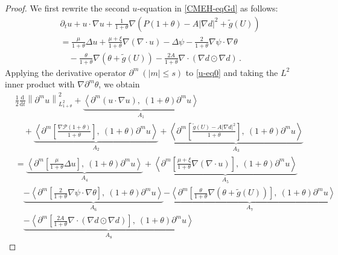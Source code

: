 \documentclass[reqno,11pt]{amsart}
\numberwithin{equation}{section}
\def\p{\partial}
\def\d{\mathrm{d}}
\begin{document}
\begin{proof}

We first rewrite the second $u$-equation in \eqref{CMEH-eqGd} as follows:
\begin{equation}\label{u-eq0}
\begin{aligned}
& \partial_t u + u \cdot \nabla u + \frac{1}{1+\theta} \nabla \left( P(1+\theta) - A |\nabla d|^2 + \tilde{g}(U) \right) \\
& = \frac{\mu}{1+\theta} \Delta u + \frac{\mu + \xi}{1+\theta} \nabla (\nabla \cdot u) - \Delta \psi - \frac{2}{1+\theta} \nabla \psi \cdot \nabla \theta \\
& \quad - \frac{\theta}{1+\theta} \nabla \left( \theta + \tilde{g}(U) \right) - \frac{2A}{1+\theta} \nabla \cdot \left( \nabla d \odot \nabla d \right) \,.
\end{aligned}
\end{equation}
Applying the derivative operator $\p^m \ ( |m|\leq s)$ to \eqref{u-eq0} and taking the $L^2$ inner product with $\nabla\p^m \theta$, we obtain
\begin{equation}\label{u-eq1}
\begin{aligned}
&\frac{1}{2} \frac{\d}{\d t} \left\| \partial^m u \right\|_{L^2_{1+\theta}}^2 + \underset{A_1}{\underbrace{\left\langle \partial^m (u \cdot \nabla u),\ (1+\theta) \partial^m u \right\rangle}} \\
& \quad + \underset{A_2}{\underbrace{\left\langle \partial^m \left[ \frac{\nabla \mathcal{P}(1+\theta)}{1+\theta} \right],\ (1+\theta) \partial^m u \right\rangle}}
+\underset{A_3}{\underbrace{ \left\langle \partial^m \left[ \frac{\tilde{g}(U) - A|\nabla d|^2}{1+\theta} \right],\ (1+\theta) \partial^m u \right\rangle}}\\
& = \underset{A_4}{\underbrace{\left\langle \partial^m \left[ \frac{\mu}{1+\theta} \Delta u \right],\ (1+\theta) \partial^m u \right\rangle}}
+ \underset{A_5}{ \underbrace{ \left\langle \partial^m \left[ \frac{\mu+\xi}{1+\theta} \nabla (\nabla \cdot u) \right],\ (1+\theta) \partial^m u \right\rangle}} \\
& \quad \underset{A_6}{\underbrace{- \left\langle \partial^m \left[ \frac{2}{1+\theta} \nabla \psi \cdot \nabla \theta \right],\ (1+\theta) \partial^m u \right\rangle}} \underset{A_7}{\underbrace{- \left\langle \partial^m \left[ \frac{\theta}{1+\theta} \nabla \left(\theta+\tilde{g}(U) \right) \right],\ (1+\theta) \partial^m u \right\rangle}} \\
& \quad \underset{A_8}{\underbrace{- \left\langle \partial^m \left[ \frac{2A}{1+\theta} \nabla \cdot (\nabla d \odot \nabla d) \right],\ (1+\theta) \partial^m u \right\rangle}}

\end{aligned}
\end{equation}
\end{proof}
\end{document}
